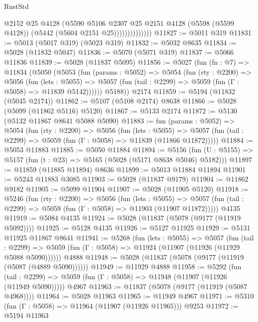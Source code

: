 \begin{lexlean}{RustStd}
\begin{coremodule}
{\begin{coremodule}
{{{{{{{{{{{{                          @2152
                          @25
                          @4128
                          (@5590
                            @5106
                            @2307
                            @25
                            @2151
                            @4128
                            (@5598 (@5599 @4128))
                            (@5442 (@5604 @2151 @25))))))))))))))
@11827 := @5011 @319
@11831 := @5013 (@5017 @319) (@5023 @319)
@11832 := @5032 @8635
@11834 := @5028 (@11832 @5047)
@11836 := @5070 (@5071 @319)
@11837 := @5066 @11836
@11839 := @5028 (@11837 @5095)
@11856 := @5027
    (fun (fn : @7) =>
    @11834
      (@5050
        (@5053
          (fun (params : @5052) =>
          @5054
            (fun (rty : @2200) =>
            @5056
              (fun (lets : @5055) =>
              @5057 (fun (tail : @2299) => @5059 (fun (Γ : @5058) => @11839 @5142))))))
        @5188))
    @2174
@11859 := @5194 (@11832 (@5045 @2174))
@11862 := @5107 (@5108 @2174) @8638
@11866 := @5028 (@5099 (@11862 @5116) @5120)
@11867 := @5133 @2174
@11872 := @5130 (@5132 @11867 @8641 @5088 @5090)
@11883 := fun (params : @5052) =>
  @5054
    (fun (rty : @2200) =>
    @5056
      (fun (lets : @5055) =>
      @5057 (fun (tail : @2299) => @5059 (fun (Γ : @5058) => @11839 (@11866 @11872)))))
@11884 := @5053 @11883
@11885 := @5050 @11884
@11894 := @5156
    (fun (U : @5155) => @5157 (fun (t : @23) => @5165 (@5028 (@5171 @8638 @5046) @5182)))
@11897 := @11859 (@11885 @11894) @8636
@11899 := @5013 @11884 @11894
@11901 := @5243 @11883 @3085
@11903 := @5028 (@11837 @9179)
@11904 := @11862 @9182
@11905 := @5099 @11904
@11907 := @5028 (@11905 @5120)
@11918 := @5246
    (fun (rty : @2200) =>
    @5056
      (fun (lets : @5055) =>
      @5057 (fun (tail : @2299) => @5059 (fun (Γ : @5058) => @11903 (@11907 @11872)))))
    @4135
@11919 := @5084 @4135
@11924 := @5028 (@11837 (@5078 (@9177 (@11919 @5092))))
@11925 := @5128 @4135
@11926 := @5127 @11925
@11929 := @5131 @11925 @11867 @8641
@11941 := @5268
    (fun (lets : @5055) =>
    @5057
      (fun (tail : @2299) =>
      @5059 (fun (Γ : @5058) => @11924 (@11907 (@11926 (@11929 @5088 @5090))))))
    @4888
@11948 := @5028 (@11837 (@5078 (@9177 (@11919 (@5087 (@4889 @5090))))))
@11949 := @11929 @4888
@11958 := @5292
    (fun (tail : @2299) => @5059 (fun (Γ : @5058) => @11948 (@11907 (@11926 (@11949 @5090)))))
    @4967
@11963 := @11837 (@5078 (@9177 (@11919 (@5087 @4968))))
@11964 := @5028 @11963
@11965 := @11949 @4967
@11971 := @5310 (fun (Γ : @5058) => @11964 (@11907 (@11926 @11965))) @9253
@11972 := @5194 @11963
}}}}}}}}}}}}
\end{coremodule}}
\end{coremodule}
\end{lexlean}
